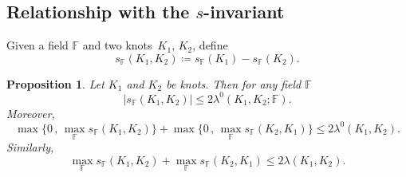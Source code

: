 \documentclass[11pt,a4paper,twoside]{amsart}
\newtheorem{proposition}[theorem]{Proposition}
\theoremstyle{definition}
\def\lambda{λ}%
\newcommand{\lambdau}{\lambda^0}
\newcommand{\F}{\mathbb{F}}
\begin{document}
\subsection{\texorpdfstring{Relationship with the $s$-invariant}{Relationship with the s-invariant}}

%

Given a field $\F$ and two knots~$K_1,\,K_2$, define 
\[
s_{\F}(K_1,K_2)\coloneqq s_{\F}(K_1)-s_{\F}(K_2).
\]

\begin{proposition}\label{thm:s_invariant_and_graded_lambda}
	Let \(K_1\) and \(K_2\) be knots. Then for any field \(\F\)
		\begin{equation} \label{eq:rasmussen_u_bound1}
		|s_{\F}(K_1,K_2)| 
		\leq 
		2\lambdau(K_1,K_2;\F).
		\end{equation}
	Moreover, 
		\begin{equation} \label{eq:rasmussen_u_bound2}
		\max \{0\, ,\, \max_{\F} s_{\F}(K_1,K_2)\} 
		+ 
		\max \{0\, ,\, \max_{\F} s_{\F}(K_2,K_1)\} 
		\leq 
		2\lambdau(K_1,K_2).
		\end{equation}
	Similarly,
		\[
		\max_{\F} s_{\F}(K_1,K_2) 
		+ 
		\max_{\F} s_{\F}(K_2,K_1) 
		\leq 
		2\lambda(K_1,K_2).
		\]
\end{proposition}
\end{document}
